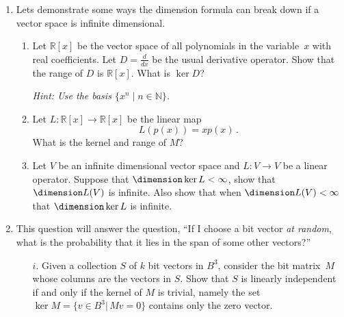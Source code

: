 \begin{enumerate}

\item %
Lets demonstrate some ways the dimension formula can break down if a vector space is infinite dimensional.
\begin{enumerate}
\item Let $\mathbb{R}[x]$ be the vector space of all polynomials  in the variable~$x$ with real coefficients. Let $D = \frac{d}{dx}$ be the usual derivative operator. Show that the range of $D$ is $\mathbb{R}[x]$. What is $\ker D$?

\emph{Hint: Use the basis $\{ x^n \mid n \in \mathbb{N} \}$.}

\item Let $L \colon \mathbb{R}[x] \rightarrow \mathbb{R}[x]$ be the linear map \[L(p(x)) = xp(x)\, .\]  What is the kernel and range of $M$?



\item Let $V$ be an infinite dimensional vector space and $L \colon V \rightarrow V$ be a linear operator. Suppose that $\dimension \ker L < \infty$, show that $\dimension L(V)$ is infinite. Also show that when $\dimension L(V) < \infty$ that $\dimension \ker L$ is infinite.
\end{enumerate}

\item This question will answer the question, ``If I choose a bit vector \emph{at random}, what is the probability that it lies in the span of some other vectors?''

\begin{itemize}
\item[$i.$] Given a collection $S$ of $k$ bit vectors in $B^3$, consider the bit matrix~$M$ whose columns are the vectors in $S$.  Show that $S$ is linearly independent if and only if the kernel of $M$ is trivial, namely the set $\ker M=\{v\in B^3| \, Mv=0\}$ contains only the zero vector.


\end{itemize}
\end{enumerate}
